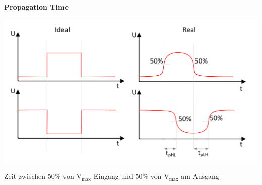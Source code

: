 \noindent\begin{minipage}{\textwidth}
	\noindent\textbf{Propagation Time}
	
	\begin{minipage}{0.25\textwidth}
		\includegraphics[width=\linewidth,keepaspectratio=true]{./Images/propagationtime.png}
	\end{minipage}%
	\begin{minipage}{0.20\textwidth}
		Zeit zwischen 50\% von V$_\text{max}$ Eingang und 50\% von  V$_\text{max}$ am Ausgang
	\end{minipage}
\end{minipage}


